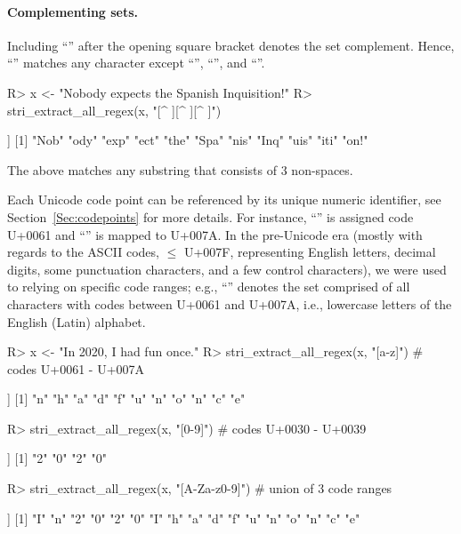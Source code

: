 \documentclass[nojss]{jss}
\begin{document}
\paragraph{Complementing sets.}
Including ``\code{\^{}}'' after the opening square bracket denotes the set complement.
Hence, ``\code{[\^{}abc]}'' matches any character except ``'',
``'', and ``''.

\begin{Schunk}
\begin{Sinput}
R> x <- "Nobody expects the Spanish Inquisition!"
R> stri_extract_all_regex(x, "[^ ][^ ][^ ]")
\end{Sinput}
\begin{Soutput}
[[1]]
 [1] "Nob" "ody" "exp" "ect" "the" "Spa" "nis" "Inq" "uis" "iti" "on!"
\end{Soutput}
\end{Schunk}

\noindent
The above matches any substring that consists of 3 non-spaces.

Each Unicode code point can be referenced by its unique numeric identifier,
see Section~\ref{Sec:codepoints}  for more details.
For instance, ``'' is assigned code U+0061 and ``'' is mapped to U+007A.
In the pre-Unicode era (mostly with regards to the ASCII codes, $\le$ U+007F,
representing English letters, decimal digits, some punctuation characters,
and a few control characters),
we were used to relying on specific code ranges; e.g.,
``\code{[a-z]}'' denotes the set comprised of all
characters with codes between U+0061 and U+007A, i.e., lowercase letters
of the English (Latin) alphabet.

\begin{Schunk}
\begin{Sinput}
R> x <- "In 2020, I had fun once."
R> stri_extract_all_regex(x, "[a-z]")        # codes U+0061 - U+007A
\end{Sinput}
\begin{Soutput}
[[1]]
 [1] "n" "h" "a" "d" "f" "u" "n" "o" "n" "c" "e"
\end{Soutput}
\begin{Sinput}
R> stri_extract_all_regex(x, "[0-9]")        # codes U+0030 - U+0039
\end{Sinput}
\begin{Soutput}
[[1]]
[1] "2" "0" "2" "0"
\end{Soutput}
\begin{Sinput}
R> stri_extract_all_regex(x, "[A-Za-z0-9]")  # union of 3 code ranges
\end{Sinput}
\begin{Soutput}
[[1]]
 [1] "I" "n" "2" "0" "2" "0" "I" "h" "a" "d" "f" "u" "n" "o" "n" "c" "e"
\end{Soutput}
\end{Schunk}
\end{document}

